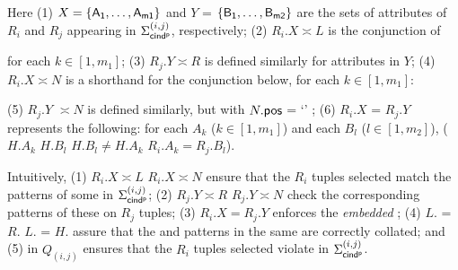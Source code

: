 \noindent Here (1) $X = \{\protect\mathsf{A_1,\dots, A_{m1}}\}$ and $Y$ =
$\{\protect\mathsf{B_1,\dots, B_{m2}}\}$ are the sets of attributes of $R_i$ and
 $R_j$ appearing in $\Sigma_{{\mathsf{cind^p}}}^{(i,j)}$, respectively;
(2) $R_i.X\asymp L$ is the conjunction of


\begin{footnotesize}
\end{footnotesize}

\noindent
for each $k\in[1, m_1]$;
(3) $R_j.Y\asymp R$ is defined similarly for attributes
 in $Y$;
(4) $R_i.X\asymp N$ is a shorthand for the conjunction below,
for each $k\in[1, m_1]$:

\begin{footnotesize}
\end{footnotesize}

\noindent
(5) $R_j.Y$ $\asymp N$ is defined similarly,
but with $N.\protect\mathsf{pos}$ = `\RHS' ; (6) $R_i.X$
  = $R_j.Y$ represents the following:
for each $A_k$  ($k\in[1, m_1]$) and each $B_l$ ($l\in[1, m_2]$),
($H.A_k$ 
 $H.B_l$   $H.B_l \ne H.A_k$   $R_i.A_k
= R_j.B_l$).



Intuitively, (1) $R_i.X\asymp L$  $R_i.X\asymp N$ ensure
that the $R_i$ tuples selected match the \LHS patterns of some
\pCINDs in  $\Sigma_{{\mathsf{cind^p}}}^{(i,j)}$;
(2) $R_j.Y\asymp R$  $R_j.Y\asymp N$ check the corresponding
 \RHS patterns of these \pCINDs on
$R_j$ tuples;
(3) $R_i.X = R_j.Y$ enforces the
{\em embedded} \INDs; (4) $L$. = $R$.
 $L$. = $H$. assure that the \LHS and
\RHS patterns in the same \pCIND are correctly collated; and (5)  in $Q_{(i,j)}$ ensures that the $R_i$ tuples selected violate
\pCINDs in $\Sigma_{{\mathsf{cind^p}}}^{(i,j)}$.



